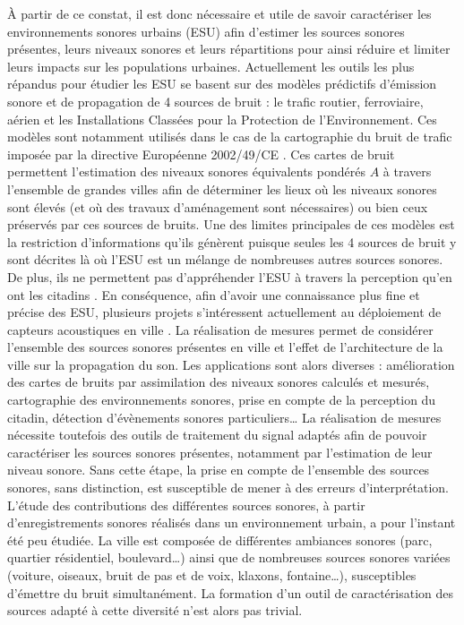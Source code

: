 À partir de ce constat, il est donc nécessaire et utile de savoir caractériser les environnements sonores urbains (ESU) afin d'estimer les sources sonores présentes, leurs niveaux sonores et leurs répartitions pour ainsi réduire et limiter leurs impacts sur les populations urbaines.
Actuellement les outils les plus répandus pour étudier les ESU se basent sur des modèles prédictifs d'émission sonore et de propagation de 4 sources de bruit : le trafic routier, ferroviaire, aérien et les Installations Classées pour la Protection de l'Environnement. Ces modèles sont notamment utilisés dans le cas de la cartographie du bruit de trafic imposée par la directive Européenne 2002/49/CE \cite{directive}. Ces cartes de bruit permettent l'estimation des niveaux sonores équivalents pondérés $A$ à travers l'ensemble de grandes villes afin de déterminer les lieux où les niveaux sonores sont élevés (et où des travaux d'aménagement sont nécessaires) ou bien ceux préservés par ces sources de bruits. Une des limites principales de ces modèles est la restriction d'informations qu'ils génèrent puisque seules les 4 sources de bruit y sont décrites là où l'ESU est un mélange de nombreuses autres sources sonores. De plus, ils ne permettent pas d'appréhender l'ESU à travers la perception qu'en ont les citadins \cite{aumond2017modeling}.
En conséquence, afin d'avoir une connaissance plus fine et précise des ESU, plusieurs projets s'intéressent actuellement au déploiement de capteurs acoustiques en ville \cite{picaut2017characterization,zambon2017life}. La réalisation de mesures permet de considérer l'ensemble des sources sonores présentes en ville et l'effet de l'architecture de la ville sur la propagation du son. Les applications sont alors diverses : amélioration des cartes de bruits par assimilation des niveaux sonores calculés et mesurés, cartographie des environnements sonores, prise en compte de la perception du citadin, détection d'évènements sonores particuliers\dots{}
La réalisation de mesures nécessite toutefois des outils de traitement du signal adaptés afin de pouvoir caractériser les sources sonores présentes, notamment par l'estimation de leur niveau sonore. Sans cette étape, la prise en compte de l'ensemble des sources sonores, sans distinction, est susceptible de mener à des erreurs d'interprétation. L'étude des contributions des différentes sources sonores, à partir d'enregistrements sonores réalisés dans un environnement urbain, a pour l'instant été peu étudiée.
La ville est composée de différentes ambiances sonores (parc, quartier résidentiel, boulevard\dots{}) ainsi que de nombreuses sources sonores variées (voiture, oiseaux, bruit de pas et de voix, klaxons, fontaine\dots{}), susceptibles d'émettre du bruit simultanément. La formation d'un outil de caractérisation des sources adapté à cette diversité n'est alors pas trivial.


